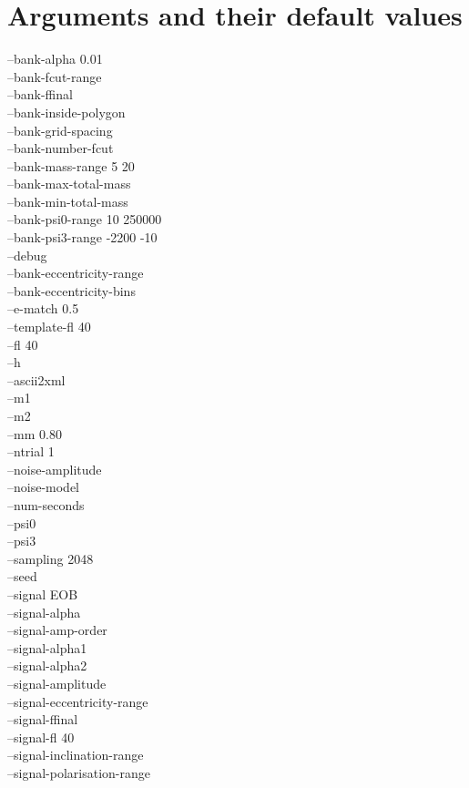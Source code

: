 \documentclass[a4paper,10pt]{article}
\begin{document}
\section{Arguments and their default values}\label{default}
--bank-alpha 0.01\\
--bank-fcut-range\\
--bank-ffinal\\
--bank-inside-polygon\\
--bank-grid-spacing\\
--bank-number-fcut\\
--bank-mass-range 5 20\\
--bank-max-total-mass\\
--bank-min-total-mass\\
--bank-psi0-range 10 250000\\
--bank-psi3-range -2200 -10\\
--debug\\
--bank-eccentricity-range \\
--bank-eccentricity-bins\\ 
--e-match 0.5\\
--template-fl 40\\
--fl 40\\
--h\\
--ascii2xml\\
--m1\\
--m2\\
--mm 0.80\\
--ntrial 1\\
--noise-amplitude \\
--noise-model\\
--num-seconds\\
--psi0\\
--psi3\\
--sampling 2048\\
--seed\\
--signal EOB\\
--signal-alpha\\
--signal-amp-order\\
--signal-alpha1\\
--signal-alpha2\\
--signal-amplitude\\
--signal-eccentricity-range\\
--signal-ffinal\\
--signal-fl 40\\
--signal-inclination-range\\
--signal-polarisation-range\\
\end{document}
